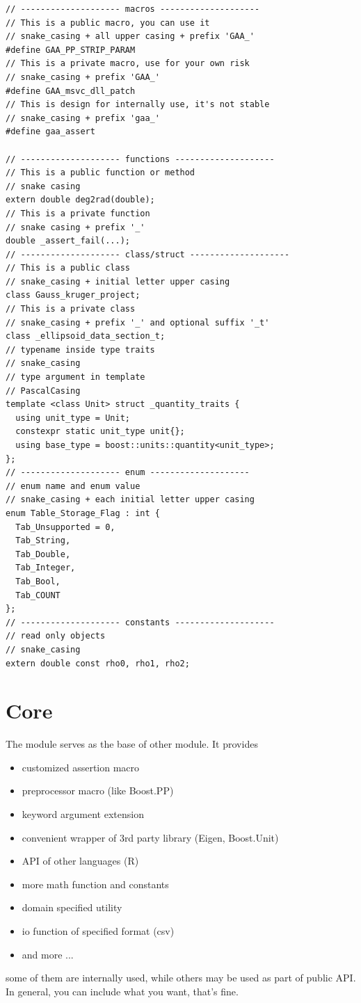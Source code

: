 \documentclass[9pt,a4paper,onecolumn,oneside]{rho-class/rho}
\begin{document}
\begin{code}
    \caption{Naming rules of GAA}
    \label{lst:rules}
    \begin{verbatim}
// -------------------- macros --------------------
// This is a public macro, you can use it
// snake_casing + all upper casing + prefix 'GAA_'
#define GAA_PP_STRIP_PARAM 
// This is a private macro, use for your own risk
// snake_casing + prefix 'GAA_'
#define GAA_msvc_dll_patch 
// This is design for internally use, it's not stable
// snake_casing + prefix 'gaa_'
#define gaa_assert 

// -------------------- functions --------------------
// This is a public function or method
// snake casing
extern double deg2rad(double); 
// This is a private function
// snake casing + prefix '_'
double _assert_fail(...); 
// -------------------- class/struct --------------------
// This is a public class
// snake_casing + initial letter upper casing
class Gauss_kruger_project;
// This is a private class
// snake_casing + prefix '_' and optional suffix '_t'
class _ellipsoid_data_section_t;
// typename inside type traits
// snake_casing
// type argument in template
// PascalCasing
template <class Unit> struct _quantity_traits {
  using unit_type = Unit;
  constexpr static unit_type unit{};
  using base_type = boost::units::quantity<unit_type>;
};
// -------------------- enum --------------------
// enum name and enum value
// snake_casing + each initial letter upper casing
enum Table_Storage_Flag : int {
  Tab_Unsupported = 0,
  Tab_String,
  Tab_Double,
  Tab_Integer,
  Tab_Bool,
  Tab_COUNT
};
// -------------------- constants --------------------
// read only objects
// snake_casing
extern double const rho0, rho1, rho2;
\end{verbatim}
\end{code}

\section{Core}
The  module serves as the base of other module. It provides
\begin{itemize}
    \item customized assertion macro
    \item preprocessor macro (like Boost.PP)
    \item keyword argument extension
    \item convenient wrapper of 3rd party library (Eigen, Boost.Unit)
    \item API of other languages (R)
    \item more math function and constants
    \item domain specified utility
    \item io function of specified format (csv)
    \item and more ...
\end{itemize}
some of them are internally used, while others may be used as part of public API. In general, you can include what you want, that's fine.
\end{document}
